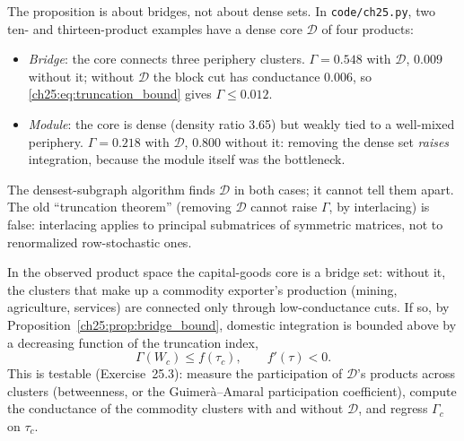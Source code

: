 \documentclass[../structural_economics_book.tex]{subfiles}
\begin{document}
\begin{remark}\label{ch25:rem:module}
The proposition is about bridges, not about dense sets. In \texttt{code/ch25.py}, two ten- and thirteen-product examples have a dense core $\mathcal{D}$ of four products:
\begin{itemize}
\item \emph{Bridge}: the core connects three periphery clusters. $\Gamma = 0.548$ with $\mathcal{D}$, $0.009$ without it; without $\mathcal{D}$ the block cut has conductance 0.006, so \eqref{ch25:eq:truncation_bound} gives $\Gamma \le 0.012$.
\item \emph{Module}: the core is dense (density ratio 3.65) but weakly tied to a well-mixed periphery. $\Gamma = 0.218$ with $\mathcal{D}$, $0.800$ without it: removing the dense set \emph{raises} integration, because the module itself was the bottleneck.
\end{itemize}
The densest-subgraph algorithm finds $\mathcal{D}$ in both cases; it cannot tell them apart. The old ``truncation theorem'' (removing $\mathcal{D}$ cannot raise $\Gamma$, by interlacing) is false: interlacing applies to principal submatrices of symmetric matrices, not to renormalized row-stochastic ones.
\end{remark}

\begin{conjecture}\label{ch25:thm:truncation}
In the observed product space the capital-goods core is a bridge set: without it, the clusters that make up a commodity exporter's production (mining, agriculture, services) are connected only through low-conductance cuts. If so, by Proposition~\ref{ch25:prop:bridge_bound}, domestic integration is bounded above by a decreasing function of the truncation index,
\[
\Gamma(W_c) \le f(\tau_c), \qquad f'(\tau) < 0.
\]
This is testable (Exercise~25.3): measure the participation of $\mathcal{D}$'s products across clusters (betweenness, or the Guimer\`{a}--Amaral participation coefficient), compute the conductance of the commodity clusters with and without $\mathcal{D}$, and regress $\Gamma_c$ on $\tau_c$.
\end{conjecture}
\end{document}
